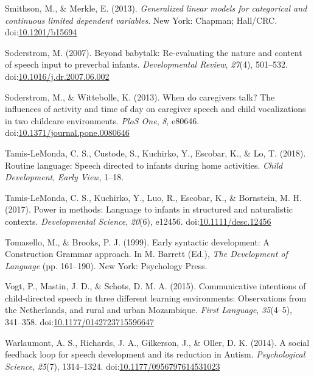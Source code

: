 \documentclass[floatsintext,man]{apa6}
\theoremstyle{definition}
\theoremstyle{definition}
\theoremstyle{definition}
\theoremstyle{remark}
\begin{document}
\hypertarget{ref-smithson2013generalized}{}
Smithson, M., \& Merkle, E. (2013). \emph{Generalized linear models for
categorical and continuous limited dependent variables}. New York:
Chapman; Hall/CRC.
doi:\href{https://doi.org/10.1201/b15694}{10.1201/b15694}

\hypertarget{ref-soderstrom2007beyond}{}
Soderstrom, M. (2007). Beyond babytalk: Re-evaluating the nature and
content of speech input to preverbal infants. \emph{Developmental
Review}, \emph{27}(4), 501--532.
doi:\href{https://doi.org/10.1016/j.dr.2007.06.002}{10.1016/j.dr.2007.06.002}

\hypertarget{ref-soderstrom2013when}{}
Soderstrom, M., \& Wittebolle, K. (2013). When do caregivers talk? The
influences of activity and time of day on caregiver speech and child
vocalizations in two childcare environments. \emph{PloS One}, \emph{8},
e80646.
doi:\href{https://doi.org/10.1371/journal.pone.0080646}{10.1371/journal.pone.0080646}

\hypertarget{ref-tamislemonda2018routine}{}
Tamis-LeMonda, C. S., Custode, S., Kuchirko, Y., Escobar, K., \& Lo, T.
(2018). Routine language: Speech directed to infants during home
activities. \emph{Child Development}, \emph{Early View}, 1--18.

\hypertarget{ref-tamislemonda2017power}{}
Tamis-LeMonda, C. S., Kuchirko, Y., Luo, R., Escobar, K., \& Bornstein,
M. H. (2017). Power in methods: Language to infants in structured and
naturalistic contexts. \emph{Developmental Science}, \emph{20}(6),
e12456.
doi:\href{https://doi.org/10.1111/desc.12456}{10.1111/desc.12456}

\hypertarget{ref-tomasello1999early}{}
Tomasello, M., \& Brooks, P. J. (1999). Early syntactic development: A
Construction Grammar approach. In M. Barrett (Ed.), \emph{The
Development of Language} (pp. 161--190). New York: Psychology Press.

\hypertarget{ref-vogt2015communicative}{}
Vogt, P., Mastin, J. D., \& Schots, D. M. A. (2015). Communicative
intentions of child-directed speech in three different learning
environments: Observations from the Netherlands, and rural and urban
Mozambique. \emph{First Language}, \emph{35}(4--5), 341--358.
doi:\href{https://doi.org/10.1177/0142723715596647}{10.1177/0142723715596647}

\hypertarget{ref-warlaumont2014social}{}
Warlaumont, A. S., Richards, J. A., Gilkerson, J., \& Oller, D. K.
(2014). A social feedback loop for speech development and its reduction
in Autism. \emph{Psychological Science}, \emph{25}(7), 1314--1324.
doi:\href{https://doi.org/10.1177/0956797614531023}{10.1177/0956797614531023}
\end{document}
